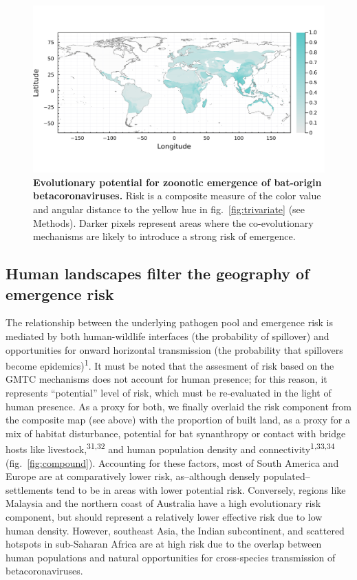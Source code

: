 \documentclass[10pt,oneside]{article}
\makeatletter
\def\maxwidth{\ifdim\Gin@nat@width>\linewidth\linewidth
\else\Gin@nat@width\fi}
\let\Oldincludegraphics\includegraphics
\renewcommand{\includegraphics}[1]{\Oldincludegraphics[width=\maxwidth]{#1}}
\makeatother
\begin{document}
\begin{figure}
\hypertarget{fig:risk}{%
\centering
\includegraphics{figures/risk_map.png}
\caption{\textbf{Evolutionary potential for zoonotic emergence of
bat-origin betacoronaviruses.} Risk is a composite measure of the color
value and angular distance to the yellow hue in
fig.~\ref{fig:trivariate} (see Methods). Darker pixels represent areas
where the co-evolutionary mechanisms are likely to introduce a strong
risk of emergence.}\label{fig:risk}
}
\end{figure}

\hypertarget{human-landscapes-filter-the-geography-of-emergence-risk}{%
\subsection{Human landscapes filter the geography of emergence
risk}\label{human-landscapes-filter-the-geography-of-emergence-risk}}

The relationship between the underlying pathogen pool and emergence risk
is mediated by both human-wildlife interfaces (the probability of
spillover) and opportunities for onward horizontal transmission (the
probability that spillovers become epidemics)\textsuperscript{1}. It
must be noted that the assesment of risk based on the GMTC mechanisms
does not account for human presence; for this reason, it represents
``potential'' level of risk, which must be re-evaluated in the light of
human presence. As a proxy for both, we finally overlaid the risk
component from the composite map (see above) with the proportion of
built land, as a proxy for a mix of habitat disturbance, potential for
bat synanthropy or contact with bridge hosts like
livestock,\textsuperscript{31,32} and human population density and
connectivity\textsuperscript{1,33,34} (fig.~\ref{fig:compound}).
Accounting for these factors, most of South America and Europe are at
comparatively lower risk, as--although densely populated--settlements
tend to be in areas with lower potential risk. Conversely, regions like
Malaysia and the northern coast of Australia have a high evolutionary
risk component, but should represent a relatively lower effective risk
due to low human density. However, southeast Asia, the Indian
subcontinent, and scattered hotspots in sub-Saharan Africa are at high
risk due to the overlap between human populations and natural
opportunities for cross-species transmission of betacoronaviruses.
\end{document}

